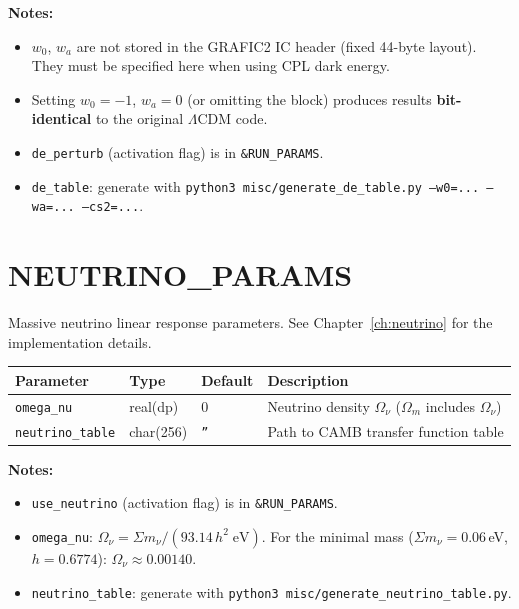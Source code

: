 \documentclass[11pt,fleqn]{book}
\begin{document}
\noindent
\textbf{Notes:}
\begin{itemize}[nosep]
  \item $w_0$, $w_a$ are not stored in the GRAFIC2 IC header (fixed 44-byte layout).  They must be specified here when using CPL dark energy.
  \item Setting $w_0=-1$, $w_a=0$ (or omitting the block) produces results \textbf{bit-identical} to the original $\Lambda$CDM code.
  \item \texttt{de\_perturb} (activation flag) is in \texttt{\&RUN\_PARAMS}.
  \item \texttt{de\_table}: generate with \texttt{python3 misc/generate\_de\_table.py --w0=... --wa=... --cs2=...}.
\end{itemize}


\chapter{NEUTRINO\_PARAMS}
\label{ch:neutrino_params_nml}

Massive neutrino linear response parameters.
See Chapter~\ref{ch:neutrino} for the implementation details.

\begin{longtable}{L{3.5cm} C{1.8cm} C{1.8cm} L{6cm}}
\toprule
\textbf{Parameter} & \textbf{Type} & \textbf{Default} & \textbf{Description} \\
\midrule
\endhead
\texttt{omega\_nu} & real(dp) & 0 & Neutrino density $\Omega_\nu$ ($\Omega_m$ includes $\Omega_\nu$) \\
\texttt{neutrino\_table} & char(256) & \texttt{''} & Path to CAMB transfer function table \\
\bottomrule
\end{longtable}

\noindent
\textbf{Notes:}
\begin{itemize}[nosep]
  \item \texttt{use\_neutrino} (activation flag) is in \texttt{\&RUN\_PARAMS}.
  \item \texttt{omega\_nu}: $\Omega_\nu = \Sigma m_\nu / (93.14\,h^2\;\text{eV})$.  For the minimal mass ($\Sigma m_\nu = 0.06\,$eV, $h=0.6774$): $\Omega_\nu \approx 0.00140$.
  \item \texttt{neutrino\_table}: generate with \texttt{python3 misc/generate\_neutrino\_table.py}.
\end{itemize}
\end{document}
